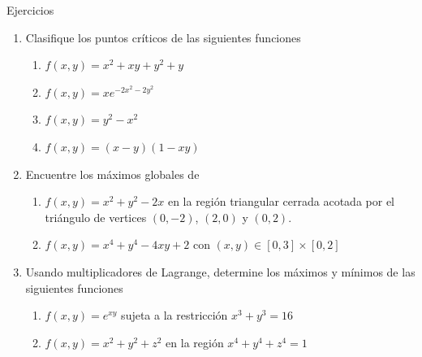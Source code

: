 
\begin{frame}{Ejercicios}
  \vspace{-0.5cm}
  \begin{enumerate}
    \item Clasifique los puntos críticos de las siguientes funciones\\[0.25cm]
      \begin{enumerate}
        \item $f(x,y)=x^2+xy+y^2+y$
        \item $f(x,y)=xe^{-2x^2-2y^2}$
        \item $f(x,y)=y^2-x^2$
        \item $f(x,y)=(x-y)(1-xy)$
      \end{enumerate}
    \vspace{0.25cm}
    \item Encuentre los máximos globales de\\[0.25cm]
      \begin{enumerate}
        \item $f(x,y)=x^2+y^2-2x$ en la región triangular cerrada acotada por el triángulo de vertices $(0,-2)$, $(2,0)$ y $(0,2)$.
        \item $f(x,y)=x^4+y^4-4xy+2$ con $(x,y)\in[0,3]\times[0,2]$\\[0.25cm]
      \end{enumerate}
    \item Usando multiplicadores de Lagrange, determine los máximos y mínimos de las siguientes funciones\\[0.25cm]
      \begin{enumerate}
        \item $f(x,y)=e^{xy}$ sujeta a la restricción $x^3+y^3 = 16$
        \item $f(x,y)=x^2+y^2+z^2$ en la región $x^4+y^4+z^4 = 1$
      \end{enumerate}
  \end{enumerate}
\end{frame}

